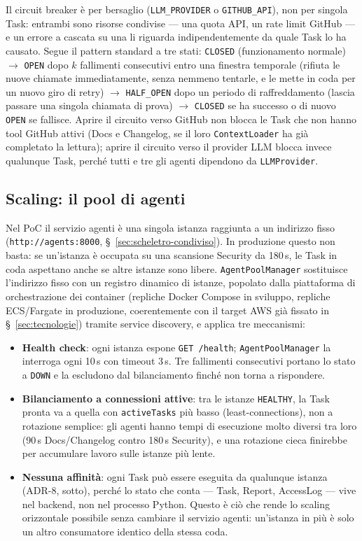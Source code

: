 \documentclass[11pt,a4paper]{article}
\begin{document}
Il circuit breaker è per bersaglio (\texttt{LLM\_PROVIDER} o \texttt{GITHUB\_API}), non per singola Task: entrambi sono risorse condivise --- una quota API, un rate limit GitHub --- e un errore a cascata su una li riguarda indipendentemente da quale Task lo ha causato. Segue il pattern standard a tre stati: \texttt{CLOSED} (funzionamento normale) $\to$ \texttt{OPEN} dopo $k$ fallimenti consecutivi entro una finestra temporale (rifiuta le nuove chiamate immediatamente, senza nemmeno tentarle, e le mette in coda per un nuovo giro di retry) $\to$ \texttt{HALF\_OPEN} dopo un periodo di raffreddamento (lascia passare una singola chiamata di prova) $\to$ \texttt{CLOSED} se ha successo o di nuovo \texttt{OPEN} se fallisce. Aprire il circuito verso GitHub non blocca le Task che non hanno tool GitHub attivi (Docs e Changelog, se il loro \texttt{ContextLoader} ha già completato la lettura); aprire il circuito verso il provider LLM blocca invece qualunque Task, perché tutti e tre gli agenti dipendono da \texttt{LLMProvider}.

\subsection{Scaling: il pool di agenti}

Nel PoC il servizio agenti è una singola istanza raggiunta a un indirizzo fisso (\texttt{http://agents:8000}, \S~\ref{sec:scheletro-condiviso}). In produzione questo non basta: se un'istanza è occupata su una scansione Security da 180\,s, le Task in coda aspettano anche se altre istanze sono libere. \texttt{AgentPoolManager} sostituisce l'indirizzo fisso con un registro dinamico di istanze, popolato dalla piattaforma di orchestrazione dei container (repliche Docker Compose in sviluppo, repliche ECS/Fargate in produzione, coerentemente con il target AWS già fissato in \S~\ref{sec:tecnologie}) tramite service discovery, e applica tre meccanismi:

\begin{itemize}
    \item \textbf{Health check}: ogni istanza espone \texttt{GET /health}; \texttt{AgentPoolManager} la interroga ogni 10\,s con timeout 3\,s. Tre fallimenti consecutivi portano lo stato a \texttt{DOWN} e la escludono dal bilanciamento finché non torna a rispondere.
    \item \textbf{Bilanciamento a connessioni attive}: tra le istanze \texttt{HEALTHY}, la Task pronta va a quella con \texttt{activeTasks} più basso (least-connections), non a rotazione semplice: gli agenti hanno tempi di esecuzione molto diversi tra loro (90\,s Docs/Changelog contro 180\,s Security), e una rotazione cieca finirebbe per accumulare lavoro sulle istanze più lente.
    \item \textbf{Nessuna affinità}: ogni Task può essere eseguita da qualunque istanza (ADR-8, sotto), perché lo stato che conta --- Task, Report, AccessLog --- vive nel backend, non nel processo Python. Questo è ciò che rende lo scaling orizzontale possibile senza cambiare il servizio agenti: un'istanza in più è solo un altro consumatore identico della stessa coda.
\end{itemize}
\end{document}

